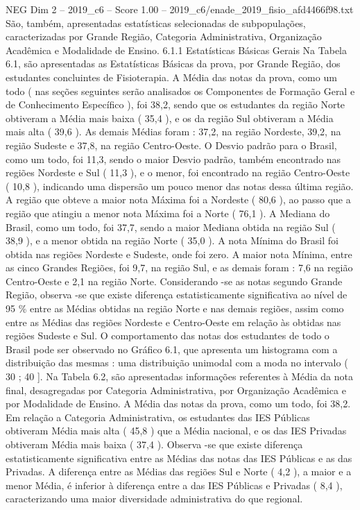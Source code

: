 \begin{textsample}{NEG Dim 2 – 2019\_c6 – Score 1.00 – 2019\_c6/enade\_2019\_fisio\_afd4466f98.txt}
São, também, apresentadas estatísticas selecionadas de subpopulações, caracterizadas por Grande Região, Categoria Administrativa, Organização Acadêmica e Modalidade de Ensino. 6.1.1 Estatísticas Básicas Gerais Na Tabela 6.1, são apresentadas as Estatísticas Básicas da prova, por Grande Região, dos estudantes concluintes de Fisioterapia.
A Média das notas da prova, como um todo ( nas seções seguintes serão analisados os Componentes de Formação Geral e de Conhecimento Específico ), foi 38,2, sendo que os estudantes da região Norte obtiveram a Média mais baixa ( 35,4 ), e os da região Sul obtiveram a Média mais alta ( 39,6 ).
As demais Médias foram : 37,2, na região Nordeste, 39,2, na região Sudeste e 37,8, na região Centro-Oeste.
O Desvio padrão para o Brasil, como um todo, foi 11,3, sendo o maior Desvio padrão, também encontrado nas regiões Nordeste e Sul ( 11,3 ), e o menor, foi encontrado na região Centro-Oeste ( 10,8 ), indicando uma dispersão um pouco menor das notas dessa última região.
A região que obteve a maior nota Máxima foi a Nordeste ( 80,6 ), ao passo que a região que atingiu a menor nota Máxima foi a Norte ( 76,1 ).
A Mediana do Brasil, como um todo, foi 37,7, sendo a maior Mediana obtida na região Sul ( 38,9 ), e a menor obtida na região Norte ( 35,0 ).
A nota Mínima do Brasil foi obtida nas regiões Nordeste e Sudeste, onde foi zero.
A maior nota Mínima, entre as cinco Grandes Regiões, foi 9,7, na região Sul, e as demais foram : 7,6 na região Centro-Oeste e 2,1 na região Norte.
Considerando -se as notas segundo Grande Região, observa -se que existe diferença estatisticamente significativa ao nível de 95 \% entre as Médias obtidas na região Norte e nas demais regiões, assim como entre as Médias das regiões Nordeste e Centro-Oeste em relação às obtidas nas regiões Sudeste e Sul.
O comportamento das notas dos estudantes de todo o Brasil pode ser observado no Gráfico 6.1, que apresenta um histograma com a distribuição das mesmas : uma distribuição unimodal com a moda no intervalo ( 30 ; 40 ].
Na Tabela 6.2, são apresentadas informações referentes à Média da nota final, desagregadas por Categoria Administrativa, por Organização Acadêmica e por Modalidade de Ensino.
A Média das notas da prova, como um todo, foi 38,2.
Em relação a Categoria Administrativa, os estudantes das IES Públicas obtiveram Média mais alta ( 45,8 ) que a Média nacional, e os das IES Privadas obtiveram Média mais baixa ( 37,4 ).
Observa -se que existe diferença estatisticamente significativa entre as Médias das notas das IES Públicas e as das Privadas.
A diferença entre as Médias das regiões Sul e Norte ( 4,2 ), a maior e a menor Média, é inferior à diferença entre a das IES Públicas e Privadas ( 8,4 ), caracterizando uma maior diversidade administrativa do que regional.

\end{textsample}
